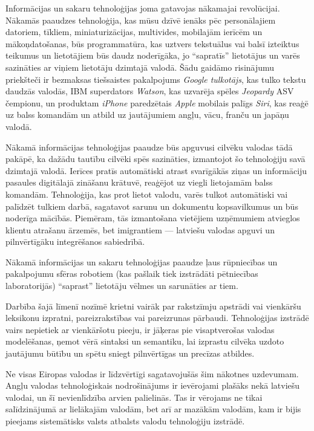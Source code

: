 \begin{multicols}{2}
Informācijas un sakaru tehnoloģijas joma gatavojas nākamajai revolūcijai.
Nākamās paaudzes tehnoloģija, kas mūsu dzīvē ienāks pēc personālajiem datoriem, tīkliem, miniaturizācijas, multivides, mobilajām ierīcēm un mākoņdatošanas, būs programmatūra, kas uztvers tekstuālus vai balsī izteiktus teikumus un lietotājiem būs daudz noderīgāka, jo “sapratīs” lietotājus un varēs sazināties ar viņiem lietotāju dzimtajā valodā.
Šādu gaidāmo risinājumu priekšteči ir bezmaksas tiešsaistes pakalpojums \textit{Google tulkotājs}, kas tulko tekstu daudzās valodās, IBM superdators \textit{Watson}, kas uzvarēja spēles \textit{Jeopardy} ASV čempionu, un produktam \textit{iPhone} paredzētais \textit{Apple} mobilais palīgs \textit{Siri}, kas reaģē uz balss komandām un atbild uz jautājumiem angļu, vācu, franču un japāņu valodā. 

Nākamā informācijas tehnoloģijas paaudze būs apguvusi cilvēku valodas tādā pakāpē, ka dažādu tautību cilvēki spēs sazināties, izmantojot šo tehnoloģiju savā dzimtajā valodā.
Ierīces pratīs automātiski atrast svarīgākās ziņas un informāciju pasaules digitālajā zināšanu krātuvē, reaģējot uz viegli lietojamām balss komandām.
Tehnoloģija, kas prot lietot valodu, varēs tulkot automātiski vai palīdzēt tulkiem darbā, sagatavot sarunu un dokumentu kopsavilkumus un būs noderīga mācībās.
Piemēram, tās izmantošana vietējiem uzņēmumiem atvieglos klientu atrašanu ārzemēs, bet imigrantiem — latviešu valodas apguvi un pilnvērtīgāku integrēšanos sabiedrībā.

Nākamā informācijas un sakaru tehnoloģijas paaudze ļaus rūpniecības un pakalpojumu sfēras robotiem (kas pašlaik tiek izstrādāti pētniecības laboratorijās) “saprast” lietotāju vēlmes un sarunāties ar tiem. 

Darbība šajā līmenī nozīmē krietni vairāk par rakstzīmju apstrādi vai vienkāršu leksikonu izpratni, pareizrakstības vai pareizrunas pārbaudi.
Tehnoloģijas izstrādē vairs nepietiek ar vienkāršotu pieeju, ir jāķeras pie visaptverošas valodas modelēšanas, ņemot vērā sintaksi un semantiku, lai izprastu cilvēka uzdoto jautājumu būtību un spētu sniegt pilnvērtīgas un precīzas atbildes.

Ne visas Eiropas valodas ir līdzvērtīgi sagatavojušās šim nākotnes uzdevumam.
Angļu valodas tehnoloģiskais nodrošinājums ir ievērojami plašāks nekā latviešu valodai, un šī nevienlīdzība arvien palielinās.
Tas ir vērojams ne tikai salīdzinājumā ar lielākajām valodām, bet arī ar mazākām valodām, kam ir bijis pieejams sistemātisks valsts atbalsts valodu tehnoloģiju izstrādē. 


\end{multicols}
